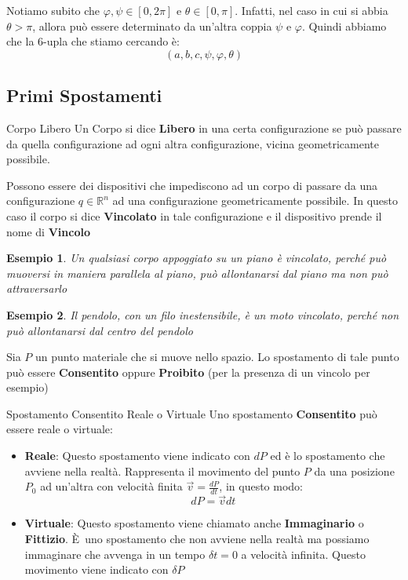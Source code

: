 \documentclass[11pt,a4paper,twoside]{article}
\newtheorem{es}{Esempio}
\theoremstyle{definition}
\begin{document}
Notiamo subito che $\varphi, \psi \in [0,2\pi]$ e $\theta \in [0, \pi]$. Infatti, nel caso in cui si abbia $\theta>\pi$, allora può essere determinato da un'altra coppia $\psi$ e $\varphi$. Quindi abbiamo che la $6$-upla che stiamo cercando è:
\[ (a,b,c, \psi, \varphi, \theta) \]

\subsection{Primi Spostamenti}

\begin{defn}{Corpo Libero}{}
	Un Corpo si dice \textbf{Libero} in una certa configurazione se può passare da quella configurazione ad ogni altra configurazione, vicina geometricamente possibile.
\end{defn}

Possono essere dei dispositivi che impediscono ad un corpo di passare da una configurazione $q \in \mathbb R^n$ ad una configurazione geometricamente possibile. In questo caso il corpo si dice \textbf{Vincolato} in tale configurazione e il dispositivo prende il nome di \textbf{Vincolo}

\begin{es}
	Un qualsiasi corpo appoggiato su un piano è vincolato, perché può muoversi in maniera parallela al piano, può allontanarsi dal piano ma non può attraversarlo
\end{es}

\begin{es}
	Il pendolo, con un filo inestensibile, è un moto vincolato, perché non può allontanarsi dal centro del pendolo
\end{es}

Sia $P$ un punto materiale che si muove nello spazio. Lo spostamento di tale punto può essere \textbf{Consentito} oppure \textbf{Proibito} (per la presenza di un vincolo per esempio)

\begin{defn}{Spostamento Consentito Reale o Virtuale}{}
	Uno spostamento \textbf{Consentito} può essere reale o virtuale:
	\begin{itemize}
		\item \textbf{Reale}: Questo spostamento viene indicato con $dP$ ed è lo spostamento che avviene nella realtà. Rappresenta il movimento del punto $P$ da una posizione $P_0$ ad un'altra con velocità finita $\vec v = \frac{dP}{dt}$, in questo modo:
			\[ dP = \vec v dt\]
		\item \textbf{Virtuale}: Questo spostamento viene chiamato anche \textbf{Immaginario} o \textbf{Fittizio}. È uno spostamento che non avviene nella realtà ma possiamo immaginare che avvenga in un tempo $\delta t =0$ a velocità infinita. Questo movimento viene indicato con $\delta P$
	\end{itemize}
\end{defn}
\end{document}
